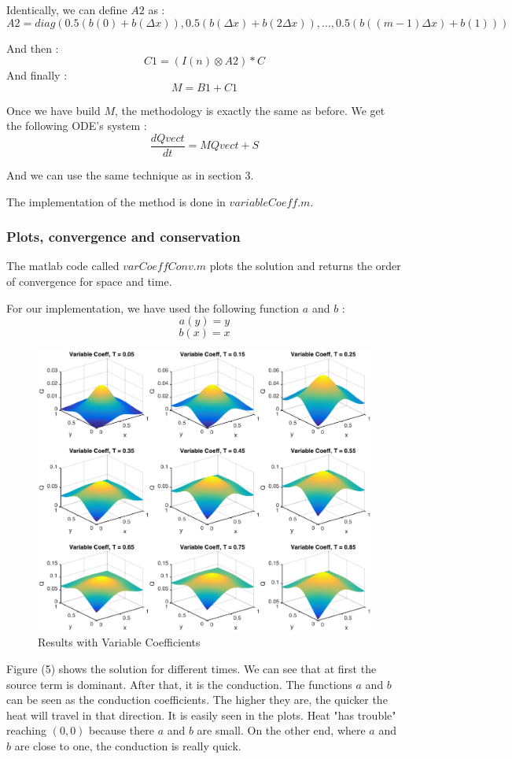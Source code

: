 Identically, we can define $A2$ as :
$$A2 = diag(0.5(b(0)+b(\Delta x)),0.5(b(\Delta x)+b(2\Delta x)),...,0.5(b((m-1)\Delta x)+b(1)))$$

And then : 
$$C1 = (I(n)\otimes A2)*C$$
And finally : 
$$M = B1 + C1$$

Once we have build $M$, the methodology is exactly the same as before. We get the following ODE's system :
$$\frac{dQvect}{dt} = MQvect + S$$

And we can use the same technique as in section 3.

The implementation of the method is done in $variableCoeff.m$.

\subsubsection{Plots, convergence and conservation}
The matlab code called $varCoeffConv.m$ plots the solution and returns the order of convergence for space and time.

For our implementation, we have used the following function $a$ and $b$ : 
$$a(y) = y$$
$$b(x) = x$$

\begin{figure}[!htb]
\centering
\includegraphics[scale=.6]{varCoeff.eps}
\caption{Results with Variable Coefficients}
\label{fig:digraph}
\end{figure}
Figure (5) shows the solution for different times. We can see that at first the source term is dominant. After that, it is the conduction. The functions $a$ and $b$ can be seen as the conduction coefficients. The higher they are, the quicker the heat will travel in that direction. It is easily seen in the plots. Heat "has trouble" reaching $(0,0)$ because there $a$ and $b$ are small. On the other end, where $a$ and $b$ are close to one, the conduction is really quick.

